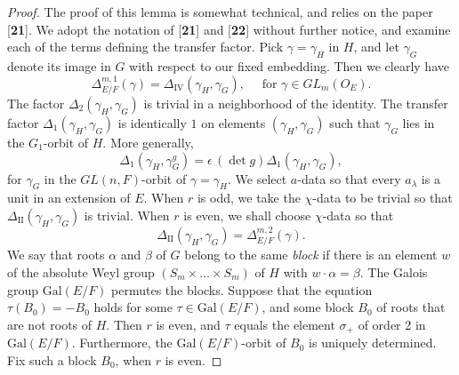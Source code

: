 \documentclass{amsart}
\begin{document}
\begin{proof}
The proof of this lemma is somewhat technical, and relies on the paper [{\bf 21}].
We adopt the notation of [{\bf 21}] and [{\bf 22}] without further notice, 
and examine each of the terms defining the transfer factor.
%
Pick
  $ \gamma = \gamma_H $
in $H$, and let
  $ \gamma_G $
denote its image in $G$ with respect to our fixed embedding.
Then we clearly have
%
$$
  \Delta_{E/F}^{m,1} (\gamma) =
  \Delta_{\text{IV}}
  (\gamma_H, \gamma_G),\quad \text{ for }
  \gamma \in GL_m (O_E).
$$
%
The factor
  $ \Delta_2 (\gamma_H, \gamma_G) $
is trivial in a neighborhood of the identity. 
The transfer factor 
  $ \Delta_1 (\gamma_H, \gamma_G) $ is identically $1$
on elements
  $ (\gamma_H, \gamma_G ) $
such that
  $ \gamma_G $ 
lies in the 
  $G_1$-orbit of $H$.
More generally,
%
$$
  \Delta_1
  (\gamma_H, \gamma_G^g) =
  \epsilon \,(\det g) \Delta_1 (\gamma_H, \gamma_G),
$$
%
for $ \gamma_G $ in the $GL(n,F)$-orbit of $ \gamma= \gamma_H $.
We select $a$-data so that every 
  $ a_{\lambda} $
is a unit in an extension of $E$.
When $r$ is odd, we take the
  $ \chi $-data to be trivial so that
  $ \Delta_{\text{II}}
    (\gamma_H, \gamma_G) $
is trivial.
When $r$ is even,
we shall choose
  $ \chi $-data so that
%
$$
  \Delta_{\text{II}} (\gamma_H, \gamma_G) =
  \Delta_{E/F}^{m,2} (\gamma) .
$$
%
We say that roots $\alpha$ and $\beta$ of $G$ belong
to the same {\it block} if there is an element $w$ of
the absolute Weyl group $(S_m\times\ldots\times S_m)$
of $H$ with $w\cdot \alpha=\beta$. The Galois group
$\text{Gal}(E/F)$ permutes the blocks.  
Suppose that the equation $\tau(B_0) = -B_0$ holds for
some $\tau\in \text{Gal}(E/F)$, and some block $B_0$ of roots
that are not roots of $H$.  Then $r$ is even,
and $\tau$ equals the element $\sigma_+$ of order 2 in $\text{Gal}(E/F)$.
Furthermore, the $\text{Gal}(E/F)$-orbit of $B_0$ is uniquely determined.
Fix such a block $B_0$, when $r$ is even.


\end{proof}
\end{document}
